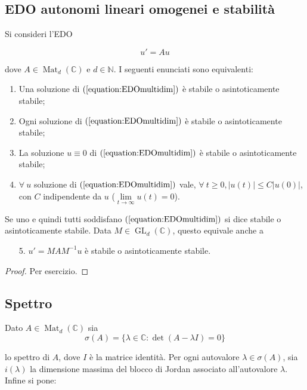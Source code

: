 \documentclass[hidelinks, 10pt]{report}
\DeclareMathOperator{\GL}{GL}
\DeclareMathOperator{\Mat}{Mat}
\begin{document}
\subsection{EDO autonomi lineari omogenei e stabilit\`a}	\label{section:21.1}

Si consideri l'EDO

\begin{equation}	\label{equation:EDOmultidim}
u' = A u
\end{equation}

dove $ A \in \Mat_{d}(\mathbb{C}) $ e $ d \in \mathbb{N} $. I seguenti enunciati sono equivalenti:

\begin{enumerate}
\item Una soluzione di $ (\ref{equation:EDOmultidim}) $ \`e stabile o asintoticamente stabile; %
\item Ogni soluzione di $ (\ref{equation:EDOmultidim}) $ \`e stabile o asintoticamente stabile;
\item La soluzione $ u \equiv 0 $ di $ (\ref{equation:EDOmultidim}) $ \`e stabile o asintoticamente stabile; %
\item $ \forall\ u $ soluzione di $ (\ref{equation:EDOmultidim}) $ vale, $ \forall\ t \ge 0, \vert u(t) \vert \le C \vert u(0) \vert $, con $ C $ indipendente da $ u $ ($\lim\limits_{t \to \infty} u(t) = 0 $).
\end{enumerate}

Se uno e quindi tutti soddisfano $ (\ref{equation:EDOmultidim}) $ si dice stabile o asintoticamente stabile. Data $ M \in \GL_{d}(\mathbb{C}) $, questo equivale anche a 

\begin{enumerate}
\item[5.] $ u' = M A M^{-1} u $ \`e stabile o asintoticamente stabile.
\end{enumerate}

\begin{proof}
Per esercizio.
\end{proof}

\subsection{Spettro}
Dato $ A \in \Mat_{d}(\mathbb{C}) $ sia 
\[ \sigma(A) = \{ \lambda \in \mathbb{C} : \det(A - \lambda I) = 0 \} \]

lo spettro di $ A $, dove $ I $ \`e la matrice identit\`a. Per ogni autovalore $ \lambda \in \sigma(A) $, sia $ i(\lambda) $ la dimensione massima del blocco di Jordan associato all'autovalore $ \lambda $. Infine si pone:
\end{document}
